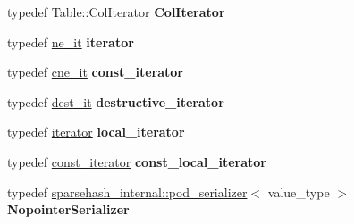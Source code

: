 \begin{DoxyCompactItemize}
\item 
typedef Table\+::\+Col\+Iterator {\bfseries Col\+Iterator}\hypertarget{classspp___1_1sparse__hashtable_a8ebbcce53806d407671d340d3fba984f}{}\label{classspp___1_1sparse__hashtable_a8ebbcce53806d407671d340d3fba984f}

\item 
typedef \hyperlink{classspp___1_1_two__d__iterator}{ne\+\_\+it} {\bfseries iterator}\hypertarget{classspp___1_1sparse__hashtable_ae8af96e3bf366e9a9f9521534688dea4}{}\label{classspp___1_1sparse__hashtable_ae8af96e3bf366e9a9f9521534688dea4}

\item 
typedef \hyperlink{classspp___1_1_two__d__iterator}{cne\+\_\+it} {\bfseries const\+\_\+iterator}\hypertarget{classspp___1_1sparse__hashtable_a394b96b0f524e54c87ee2235f5dd828f}{}\label{classspp___1_1sparse__hashtable_a394b96b0f524e54c87ee2235f5dd828f}

\item 
typedef \hyperlink{classspp___1_1_two__d__destructive__iterator}{dest\+\_\+it} {\bfseries destructive\+\_\+iterator}\hypertarget{classspp___1_1sparse__hashtable_a2663107758e450a73bdc8864f680a088}{}\label{classspp___1_1sparse__hashtable_a2663107758e450a73bdc8864f680a088}

\item 
typedef \hyperlink{classspp___1_1_two__d__iterator}{iterator} {\bfseries local\+\_\+iterator}\hypertarget{classspp___1_1sparse__hashtable_a60f4702145b6835183861f80ed402214}{}\label{classspp___1_1sparse__hashtable_a60f4702145b6835183861f80ed402214}

\item 
typedef \hyperlink{classspp___1_1_two__d__iterator}{const\+\_\+iterator} {\bfseries const\+\_\+local\+\_\+iterator}\hypertarget{classspp___1_1sparse__hashtable_a3dd5bb773b078ce0c994dc5d739f6c69}{}\label{classspp___1_1sparse__hashtable_a3dd5bb773b078ce0c994dc5d739f6c69}

\item 
typedef \hyperlink{structspp___1_1sparsehash__internal_1_1pod__serializer}{sparsehash\+\_\+internal\+::pod\+\_\+serializer}$<$ value\+\_\+type $>$ {\bfseries Nopointer\+Serializer}\hypertarget{classspp___1_1sparse__hashtable_a6e6b6a529080020f61ec1b1d9cfb4cf5}{}\label{classspp___1_1sparse__hashtable_a6e6b6a529080020f61ec1b1d9cfb4cf5}

\end{DoxyCompactItemize}

